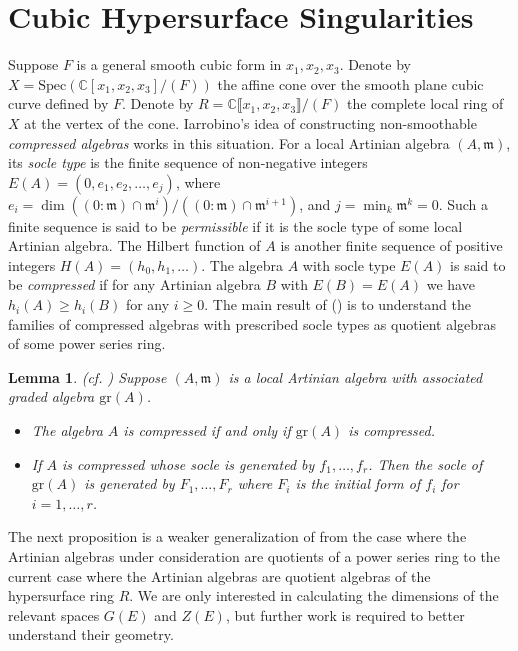 \documentclass{amsart}[12pt]
\newtheorem{lemma}[theorem]{Lemma}
\theoremstyle{definition}
\theoremstyle{remark}
\numberwithin{equation}{section}
\begin{document}
\section{Cubic Hypersurface Singularities}

Suppose $F$ is a general smooth cubic form in $x_1, x_2, x_3$. Denote by $X = \mathrm{Spec}(\mathbb{C}[x_1, x_2, x_3]/(F))$ the affine cone over the smooth plane cubic curve defined by $F$. Denote by $R = \mathbb{C}\llbracket x_1, x_2, x_3 \rrbracket/(F)$ the complete local ring of $X$ at the vertex of the cone. Iarrobino's idea of constructing non-smoothable \textit{compressed algebras} works in this situation. For a local Artinian algebra $(A, \mathfrak{m})$, its \textit{socle type} is the finite sequence of non-negative integers $E(A) = (0, e_1, e_2, \dots, e_j)$, where $e_i = \dim ((0 : \mathfrak{m}) \cap \mathfrak{m}^i) / ((0 : \mathfrak{m}) \cap \mathfrak{m}^{i + 1})$, and $j = \min_k {\mathfrak{m}^k = 0}$. Such a finite sequence is said to be \textit{permissible} if it is the socle type of some local Artinian algebra. The Hilbert function of $A$ is another finite sequence of positive integers $H(A) = (h_0, h_1, \dots)$. The algebra $A$ with socle type $E(A)$ is said to be \textit{compressed} if for any Artinian algebra $B$ with $E(B) = E(A)$ we have $h_i(A) \geq h_i(B)$ for any $i \geq 0$.  The main result of (\cite{I84}) is to understand the families of compressed algebras with prescribed socle types as quotient algebras of some power series ring. 

\begin{lemma}(cf. \cite[Corollary 3.8]{I84})
Suppose $(A, \mathfrak{m})$ is a local Artinian algebra with associated graded algebra $\mathrm{gr}(A)$. 
\begin{itemize}
\item[1.] The algebra $A$ is compressed if and only if $\mathrm{gr}(A)$ is compressed.
\item[2.] If $A$ is compressed whose socle is generated by $f_1, \dots, f_r$. Then the socle of $\mathrm{gr}(A)$ is generated by $F_1, \dots, F_r$ where $F_i$ is the initial form of $f_i$ for $i = 1, \dots, r$.
\end{itemize}
\end{lemma}

The next proposition is a weaker generalization of \cite[Theorem IIB, IIC]{I84} from the case where the Artinian algebras under consideration are quotients of a power series ring to the current  case where the Artinian algebras are quotient algebras of the hypersurface ring $R$. We are only interested in calculating the dimensions of the relevant spaces $G(E)$ and $Z(E)$, but further work is required to better understand their geometry. 
\end{document}
